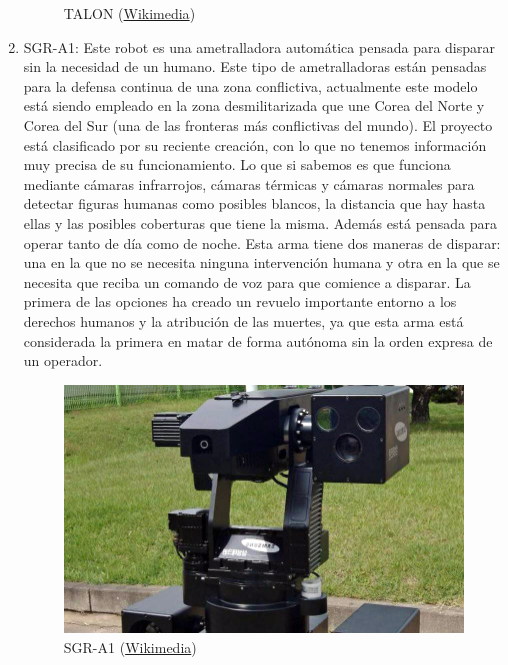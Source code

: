 \begin{enumerate}
\begin{figure}[!h]
  	\caption{TALON (\href{https://commons.wikimedia.org/wiki/File:US_Navy_090512-N-2013O-013_A_Mark_II_Talon_robot_from_Explosive_Ordnance_Disposal_Mobile_Unit_5,_Det._Japan,_is_used_to_inspect_a_suspicious_package_during_a_force_protection-anti-terrorism_training_exercise.jpg}{Wikimedia})}
  	\label{fig:talon}
  \end{figure}
  \item SGR-A1: Este robot es una ametralladora automática pensada para disparar sin la necesidad de un humano. Este tipo de ametralladoras están pensadas para la defensa continua de una zona conflictiva, actualmente este modelo está siendo empleado en la zona desmilitarizada que une Corea del Norte y Corea del Sur (una de las fronteras más conflictivas del mundo). El proyecto está clasificado por su reciente creación, con lo que no tenemos información muy precisa de su funcionamiento. Lo que si sabemos es que funciona mediante cámaras infrarrojos, cámaras térmicas y cámaras normales para detectar figuras humanas como posibles blancos, la distancia que hay hasta ellas y las posibles coberturas que tiene la misma. Además está pensada para operar tanto de día como de noche. Esta arma tiene dos maneras de disparar: una en la que no se necesita ninguna intervención humana y otra en la que se necesita que reciba un comando de voz para que comience a disparar. La primera de las opciones ha creado un revuelo importante entorno a los derechos humanos y la atribución de las muertes, ya que esta arma está considerada la primera en matar de forma autónoma sin la orden expresa de un operador.\\
  \begin{figure}[!h]
  	\centering
  	\includegraphics[scale=0.3]{./EtapaModerna/Imagenes/SGR-A1.jpg}
  	\caption{SGR-A1 (\href{https://commons.wikimedia.org/wiki/File:SGR-A1.jpg}{Wikimedia})}
  	\label{fig:sgra1}
  \end{figure}
\end{enumerate}

